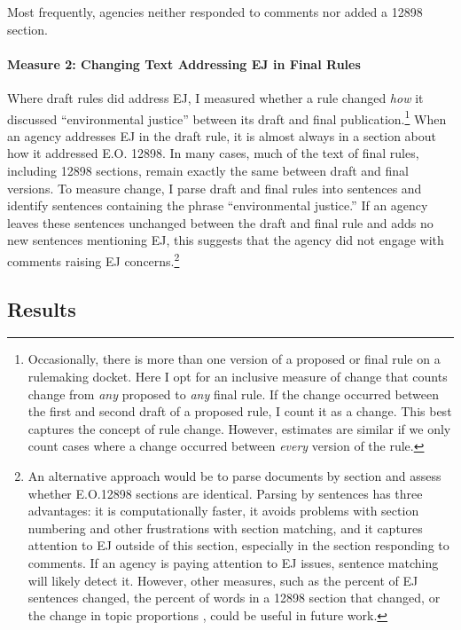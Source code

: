 \documentclass[
      12pt,
        ]{article}
\begin{document}
Most frequently, agencies neither responded to comments nor added a 12898 section.

\hypertarget{measure-2-changing-text-addressing-ej-in-final-rules}{%
\paragraph{Measure 2: Changing Text Addressing EJ in Final Rules}\label{measure-2-changing-text-addressing-ej-in-final-rules}}

Where draft rules did address EJ, I measured whether a rule changed \emph{how} it discussed ``environmental justice'' between its draft and final publication.\footnote{Occasionally, there is more than one version of a proposed or final rule on a rulemaking docket. Here I opt for an inclusive measure of change that counts change from \emph{any} proposed to \emph{any} final rule. If the change occurred between the first and second draft of a proposed rule, I count it as a change. This best captures the concept of rule change. However, estimates are similar if we only count cases where a change occurred between \emph{every} version of the rule.}
When an agency addresses EJ in the draft rule, it is almost always in a section about how it addressed E.O. 12898. In many cases, much of the text of final rules, including 12898 sections, remain exactly the same between draft and final versions.
To measure change, I parse draft and final rules into sentences and identify sentences containing the phrase ``environmental justice.'' If an agency leaves these sentences unchanged between the draft and final rule and adds no new sentences mentioning EJ, this suggests that the agency did not engage with comments raising EJ concerns.\footnote{An alternative approach would be to parse documents by section and assess whether E.O.12898 sections are identical. Parsing by sentences has three advantages: it is computationally faster, it avoids problems with section numbering and other frustrations with section matching, and it captures attention to EJ outside of this section, especially in the section responding to comments. If an agency is paying attention to EJ issues, sentence matching will likely detect it. However, other measures, such as the percent of EJ sentences changed, the percent of words in a 12898 section that changed, or the change in topic proportions \citep{Judge-Lord2017}, could be useful in future work.}

\hypertarget{results}{%
\subsection{Results}\label{results}}
\end{document}
